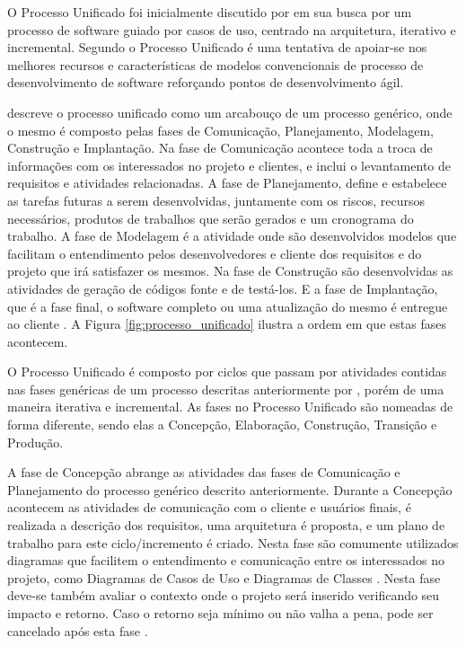O Processo Unificado foi inicialmente discutido por  em sua busca por um processo de software guiado por casos de uso, centrado na arquitetura, iterativo e incremental. Segundo  o Processo Unificado é uma tentativa de apoiar-se nos melhores recursos e características de modelos convencionais de processo de desenvolvimento de software reforçando pontos de desenvolvimento ágil.

 descreve o processo unificado como um arcabouço de um processo genérico, onde o mesmo é composto pelas fases de Comunicação, Planejamento, Modelagem, Construção e Implantação. Na fase de Comunicação acontece toda a troca de informações com os interessados no projeto e clientes, e inclui o levantamento de requisitos e atividades relacionadas. A fase de Planejamento, define e estabelece as tarefas futuras a serem desenvolvidas, juntamente com os riscos, recursos necessários, produtos de trabalhos que serão gerados e um cronograma do trabalho. A fase de Modelagem é a atividade onde são desenvolvidos modelos que facilitam o entendimento pelos desenvolvedores e cliente dos requisitos e do projeto que irá satisfazer os mesmos. Na fase de Construção são desenvolvidas as atividades de geração de códigos fonte e de testá-los. E a fase de Implantação, que é a fase final, o software completo ou uma atualização do mesmo é entregue ao cliente \cite{pressman06}. A Figura \ref{fig:processo_unificado} ilustra a ordem em que estas fases acontecem.

O Processo Unificado é composto por ciclos que passam por atividades contidas nas fases genéricas de um processo descritas anteriormente por , porém de uma maneira iterativa e incremental. As fases no Processo Unificado são nomeadas de forma diferente, sendo elas a Concepção, Elaboração, Construção, Transição e Produção.

A fase de Concepção abrange as atividades das fases de Comunicação e Planejamento do processo genérico descrito anteriormente. Durante a Concepção acontecem as atividades de comunicação com o cliente e usuários finais, é realizada a descrição dos requisitos, uma arquitetura é proposta, e um plano de trabalho para este ciclo/incremento é criado. Nesta fase são comumente utilizados diagramas que facilitem o entendimento e comunicação entre os interessados no projeto, como Diagramas de Casos de Uso e Diagramas de Classes \cite{pressman06}. Nesta fase deve-se também avaliar o contexto onde o projeto será inserido verificando seu impacto e retorno. Caso o retorno seja mínimo ou não valha a pena, pode ser cancelado após esta fase \cite{sommerville10}.

